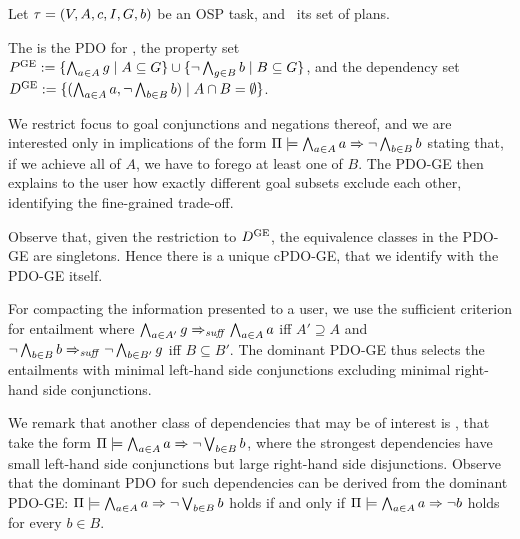 \begin{definition}
Let $\tau =
(V,\allowbreak A,\allowbreak{\ensuremath{c}},\allowbreak I,\allowbreak G,\allowbreak{\ensuremath{b}})$
be an OSP task, and \plans\ its set of plans.  

The  is the PDO for
\plans, the property set ${P^{\text{\textup{GE}}}} := \{\bigwedge_{a \in A}
g\allowbreak\mid\allowbreak A \subseteq G\} \cup \{\neg \bigwedge_{g
  \in B} b \allowbreak\mid\allowbreak B \subseteq G\}$, and the
dependency set ${D^{\text{\textup{GE}}}} := \{(\bigwedge_{a \in A} a,\allowbreak\neg
\bigwedge_{b \in B} b) \allowbreak\mid\allowbreak A \cap B =
\emptyset\}$.
\end{definition}

We restrict focus to goal conjunctions and negations thereof, and we
are interested only in implications of the form
$\Pi \models \bigwedge_{a \in A} a \Rightarrow \neg \bigwedge_{b \in B} b$
stating that, if we achieve all of $A$, we have to forego at least one
of $B$. The PDO-GE then explains to the user how exactly different
goal subsets exclude each other, identifying the fine-grained
trade-off.

Observe that, given the restriction to ${D^{\text{\textup{GE}}}}$, the equivalence
classes in the PDO-GE are singletons. Hence there is a unique cPDO-GE,
that we identify with the PDO-GE itself.

For compacting the information presented to a user, we use the
sufficient criterion for entailment where $\bigwedge_{a \in A'} g
\Rightarrow_{\mathit{suff}} \bigwedge_{a \in A} a$ iff $A' \supseteq A$ and $\neg
\bigwedge_{b \in B} b \Rightarrow_{\mathit{suff}} \neg \bigwedge_{b \in B'} g$ iff $B
\subseteq B'$. The dominant PDO-GE thus selects the entailments with
minimal left-hand side conjunctions excluding minimal right-hand side
conjunctions.
%

We remark that another class of dependencies that may be of interest
is , that take the form
$\Pi \models \bigwedge_{a \in A} a \Rightarrow \neg \bigvee_{b \in B} b$,
where the strongest dependencies have small left-hand side
conjunctions but large right-hand side disjunctions. Observe that the
dominant PDO for such dependencies can be derived from the dominant
PDO-GE: $\Pi \models \bigwedge_{a \in A} a \Rightarrow \neg \bigvee_{b \in
    B} b$ holds if and only if $\Pi \models \bigwedge_{a \in A}
  a \Rightarrow \neg b$ holds for every $b \in B$.





